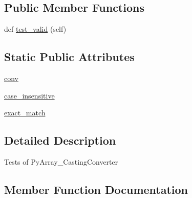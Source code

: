 \subsection*{Public Member Functions}
\begin{DoxyCompactItemize}
\item 
def \hyperlink{classnumpy_1_1core_1_1tests_1_1test__conversion__utils_1_1TestCastingConverter_a13c91f7e31806e1709fc406fca17e299}{test\+\_\+valid} (self)
\end{DoxyCompactItemize}
\subsection*{Static Public Attributes}
\begin{DoxyCompactItemize}
\item 
\hyperlink{classnumpy_1_1core_1_1tests_1_1test__conversion__utils_1_1TestCastingConverter_a8135bca0bc08ed29f2aa14c3c88074e2}{conv}
\item 
\hyperlink{classnumpy_1_1core_1_1tests_1_1test__conversion__utils_1_1TestCastingConverter_aa39b2da9f314303e5543a53460cd2964}{case\+\_\+insensitive}
\item 
\hyperlink{classnumpy_1_1core_1_1tests_1_1test__conversion__utils_1_1TestCastingConverter_a317764eb0c17c71d215daf981db9575a}{exact\+\_\+match}
\end{DoxyCompactItemize}


\subsection{Detailed Description}
\begin{DoxyVerb}Tests of PyArray_CastingConverter \end{DoxyVerb}
 

\subsection{Member Function Documentation}
\mbox{\label{classnumpy_1_1core_1_1tests_1_1test__conversion__utils_1_1TestCastingConverter_a13c91f7e31806e1709fc406fca17e299}} 
